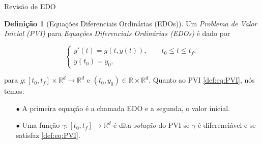 \documentclass{beamer}
\newcommand{\R}{\mathbb{R}}
\theoremstyle{plain}
\theoremstyle{definition}
\newtheorem{defi}{Definição}
\begin{document}
\begin{frame}{Revisão de EDO}

    \begin{defi}[Equações Diferenciais Ordinárias (EDOs)]
        \label{def:1:EDO} 
        Um \textit{Problema de Valor Inicial (PVI)} para \textit{Equações Diferenciais Ordinárias (EDOs)} é dado por


        \begin{equation}
            \begin{cases}
                y'(t) = g(t, y(t)), \qquad t_0 \leq t\leq t_f,\\
                y(t_0) = y_0,
            \end{cases}
            \label{def:eq:PVI}
        \end{equation}



        para $g: [t_0, t_f] \times \R^d \to \R^d$ e $(t_0, y_0) \in \R \times \R^d$. Quanto ao PVI \ref{def:eq:PVI}, nós temos:

        \begin{enumerate}
            \item[$\bullet$] A primeira equação é a chamada EDO e a segunda, o valor inicial.
            \item[$\bullet$] Uma função $\gamma: [t_0, t_f] \to \R^d$ é dita \textit{solução} do PVI se $\gamma$ é diferenciável e se satisfaz \ref{def:eq:PVI}.
        \end{enumerate}

    \end{defi}

\end{frame}

\end{document}
